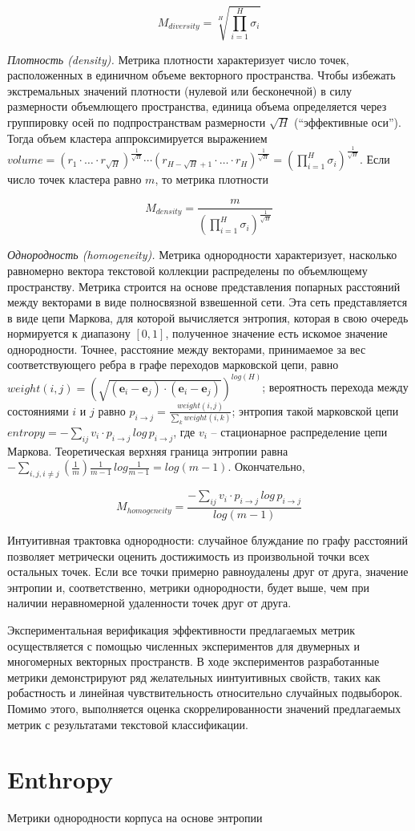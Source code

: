 \[M_{diversity} = \sqrt[H]{\prod_{i=1}^{H}\sigma_i}\]

\textit{Плотность (density).} Метрика плотности характеризует число точек, расположенных в единичном объеме векторного пространства. Чтобы избежать экстремальных значений плотности (нулевой или бесконечной) в силу размерности объемлющего пространства, единица объема определяется через группировку осей по подпространствам размерности $\sqrt{H}$ (``эффективные оси''). Тогда объем кластера аппроксимируется выражением $volume = (r_1 \cdot \ldots \cdot r_{\sqrt{H}})^{\frac{1}{\sqrt{H}}} \cdots (r_{H-\sqrt{H}+1} \cdot \ldots \cdot r_{H})^{\frac{1}{\sqrt{H}}} = (\prod_{i=1}^{H}\sigma_i)^{\frac{1}{\sqrt{H}}}$. Если число точек кластера равно $m$, то метрика плотности

\[M_{density}=\frac{m}{(\prod_{i=1}^{H}\sigma_i)^{\frac{1}{\sqrt{H}}}}\]

\textit{Однородность (homogeneity).} Метрика однородности характеризует, насколько равномерно вектора текстовой коллекции распределены по объемлющему пространству. Метрика строится на основе представления попарных расстояний между векторами в виде полносвязной взвешенной сети. Эта сеть представляется в виде цепи Маркова, для которой вычисляется энтропия, которая в свою очередь нормируется к диапазону $[0, 1]$, полученное значение есть искомое значение однородности. Точнее, расстояние между векторами, принимаемое за вес соответствующего ребра в графе переходов марковской цепи, равно $weight(i,j) = (\sqrt{(\bm{e}_i - \bm{e}_j)\cdot(\bm{e}_i - \bm{e}_j)})^{log(H)}$; вероятность перехода между состояниями $i$ и $j$ равно $p_{i \to j} = \frac{weight(i, j)}{\sum_k weight(i,k)}$; энтропия такой марковской цепи $entropy= -\sum_{ij}v_i \cdot p_{i\to j}\,log\,p_{i\to j}$, где $v_i$ -- стационарное распределение цепи Маркова. Теоретическая верхняя граница энтропии равна $-\sum_{i,j,i\neq j}(\frac{1}{m})\frac{1}{m-1}\,log\frac{1}{m-1} = log(m-1)$. Окончательно,

\[M_{homogeneity} = \frac{-\sum_{ij}v_i \cdot p_{i\to j}\,log\,p_{i\to j}}{log(m-1)}\]

\noindent Интуитивная трактовка однородности: случайное блуждание по графу расстояний позволяет метрически оценить достижимость из произвольной точки всех остальных точек. Если все точки примерно равноудалены друг от друга, значение энтропии и, соответственно, метрики однородности, будет выше, чем при наличии неравномерной удаленности точек друг от друга. 

Экспериментальная верификация эффективности предлагаемых метрик осуществляется с помощью численных экспериментов для двумерных и многомерных векторных пространств. В ходе экспериментов разработанные метрики демонстрируют ряд желательных иинтуитивных свойств, таких как робастность и линейная чувствительность относительно случайных подвыборок. Помимо этого, выполняется оценка скоррелированности значений предлагаемых метрик с результатами текстовой классификации.

\section{Enthropy}

Метрики однородности корпуса на основе энтропии
